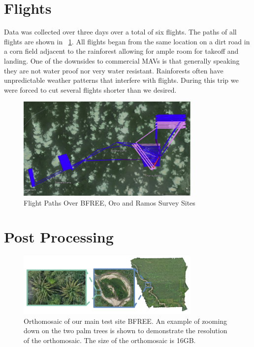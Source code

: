\section{Flights}

Data was collected over three days over a total of six flights. The paths of all flights are shown in ~\ref{fig:FlightPaths}. All flights began from the same location on a dirt road in a corn field adjacent to the rainforest allowing for ample room for takeoff and landing. One of the downsides to commercial MAVs is that generally speaking they are not water proof nor very water resistant. Rainforests often have unpredictable weather patterns that interfere with flights. During this trip we were forced to cut several flights shorter than we desired.

\begin{figure}[ht]
\includegraphics[width=0.8\textwidth]{Figures/FlightPaths.png}
\caption{Flight Paths Over BFREE, Oro and Ramos Survey Sites}
\label{fig:FlightPaths}
\end{figure}

\section{Post Processing}

\begin{figure}[ht]
\includegraphics[width=0.8\textwidth]{Figures/Orthomosaic.png}
\caption{Orthomosaic of our main test site BFREE. An example of zooming down on the two palm trees is shown to demonstrate the resolution of the orthomosaic. The size of the orthomosaic is 16GB.}
\label{fig:Orthomosaic}
\end{figure}

